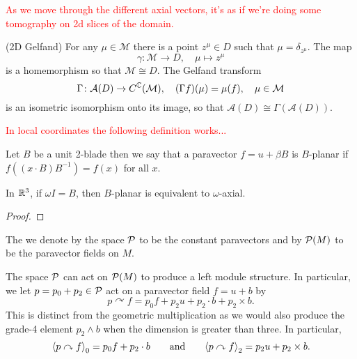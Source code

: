\documentclass[12pt]{article}
\begin{document}


\textcolor{red}{As we move through the different axial vectors, it's as if we're doing some tomography on 2d slices of the domain.}



\begin{theorem}
(2D Gelfand) For any $\mu \in \mathcal{M}$ there is a point $z^\mu \in D$ such that $\mu = \delta_{z^\mu}$. The map
\[
\gamma \colon \mathcal{M} \to D, \quad \mu \mapsto z^\mu
\]
is a homemorphism so that $\mathcal{M} \cong D$. The Gelfand transform
\[
\Gamma \colon \mathcal{A}(D) \to C^{\mathbb{C}} (\mathcal{M}), \quad (\Gamma f)(\mu) = \mu(f), \quad \mu \in \mathcal{M}
\]
is an isometric isomorphism onto its image, so that $\mathcal{A}(D)\cong \Gamma(\mathcal{A}(D))$.
\end{theorem}


\textcolor{red}{In local coordinates the following definition works...}

\begin{definition}
    Let $B$ be a unit 2-blade then we say that a paravector $f=u+\beta B$ is $B$-planar if $f((x\cdot B)B^{-1})=f(x)$ for all $x$.
\end{definition} 

\begin{theorem}
    In $\mathbb{R}^3$, if $\omega I = B$, then $B$-planar is equivalent to $\omega$-axial.
\end{theorem}
\begin{proof}
\end{proof}

\begin{definition}
    The we denote by the space $\mathcal{P}$ to be the constant paravectors and by $\mathcal{P}(M)$ to be the paravector fields on $M$.
\end{definition}

The space $\mathcal{P}$ can act on $\mathcal{P}(M)$ to produce a left module structure. In particular, we let $p = p_0 + p_2\in \mathcal{P}$ act on a paravector field $f=u+b$ by
\[
p \curvearrowright f = p_0 f + p_2 u + p_2 \cdot b + p_2 \times b.
\]
This is distinct from the geometric multiplication as we would also produce the grade-4 element $p_2\wedge b$ when the dimension is greater than three. In particular,
\[
\proj{0}{p \curvearrowright f} = p_0 f + p_2 \cdot b \qquad \textrm{and} \qquad \proj{2}{p \curvearrowright f} = p_2 u + p_2 \times b.
\]
\end{document}
